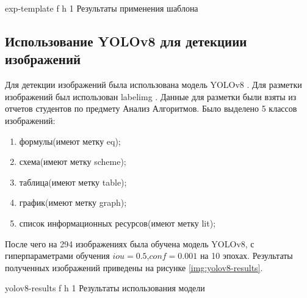 {exp-template} %
{f} %
{h} %
{1\textwidth} %
{Результаты применения шаблона} %



\subsection{Использование YOLOv8 для детекциии изображений}
Для детекции изображений была использована модель YOLOv8 \cite{YOLOv8}. Для разметки изображений был использован labelimg \cite{labelimg}. Данные для разметки были взяты из отчетов студентов по предмету Анализ Алгоритмов.
Было выделено 5 классов изображений:
\begin{enumerate}
	\item формулы(имеют метку eq);
	\item схема(имеют метку scheme);
	\item таблица(имеют метку table);
	\item график(имеют метку graph);
	\item список информационных ресурсов(имеют метку lit);
\end{enumerate}

После чего на 294 изображениях была обучена модель YOLOv8, с гиперпараметрами обучения $iou=0.5$,$conf=0.001$ на 10 эпохах.
Результаты полученных изображений приведены на рисунке \ref{img:yolov8-results}.


{yolov8-results} %
{f} %
{h} %
{1\textwidth} %
{Результаты использования модели} %





